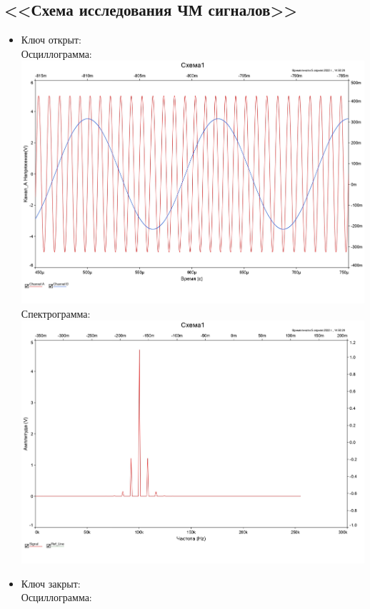 \documentclass[11pt]{article}
\begin{document}
\subsection{<<Схема исследования ЧМ сигналов>>}
\begin{itemize}
\item Ключ открыт:\\
Осциллограмма:\\
\includegraphics[width=1\linewidth]{img/1/key_open/osc.jpg}
Спектрограмма:\\
\includegraphics[width=1\linewidth]{img/1/key_open/specter.jpg}
\item Ключ закрыт:\\
Осциллограмма:\\

\end{itemize}
\end{document}
